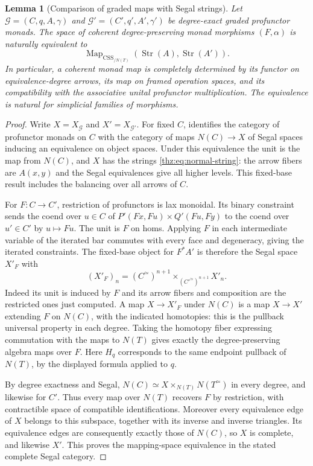 \documentclass[oneside]{article}
\theoremstyle{plain}
\newtheorem{lemma}[theorem]{Lemma}
\theoremstyle{definition}
\theoremstyle{remark}
\newcommand{\Map}{\operatorname{Map}}
\newcommand{\core}{\simeq}
\begin{document}
\begin{lemma}[Comparison of graded maps with Segal strings]
\label{lem:graded-map-comparison}
Let $\mathcal G=(C,q,A,\gamma)$ and
$\mathcal G'=(C',q',A',\gamma')$ be degree-exact graded
profunctor monads. The space of coherent degree-preserving monad
morphisms $(F,\alpha)$ is naturally equivalent to
\[
 \Map_{\operatorname{CSS}_{/N(T)}}
       (\operatorname{Str}(A),\operatorname{Str}(A')).
\]
In particular, a coherent monad map is completely determined by its
functor on equivalence-degree arrows, its map on framed operation
spaces, and its compatibility with the associative unital profunctor
multiplication. The equivalence is natural for simplicial families of
morphisms.
\end{lemma}
\begin{proof}
Write $X=X_{\mathcal G}$ and $X'=X_{\mathcal G'}$. For fixed $C$,
\cite[Cor.~5.19]{Kositsyn2021} identifies the category of profunctor
monads on $C$ with the category of maps $N(C)\to X$ of Segal spaces
inducing an equivalence on object spaces. Under this equivalence the
unit is the map from $N(C)$, and $X$ has the strings
\eqref{thz:eq:normal-string}: the arrow fibers are $A(x,y)$ and the
Segal equivalences give all higher levels. This fixed-base result
includes the balancing over all arrows of $C$.

For $F:C\to C'$, restriction of profunctors is lax monoidal. Its
binary constraint sends the coend over $u\in C$ of
$P'(Fx,Fu)\times Q'(Fu,Fy)$ to the coend over $u'\in C'$ by $u\mapsto Fu$.
The unit is $F$ on homs. Applying $F$ in each intermediate variable
of the iterated bar commutes with every face and degeneracy, giving
the iterated constraints. The fixed-base object for $F^*A'$ is therefore
the Segal space $X'_F$ with
\[
 (X'_F)_n=(C^\core)^{n+1}
        \times_{(C'^\core)^{n+1}}X'_n .
\]
Indeed its unit is induced by $F$ and its arrow fibers and composition
are the restricted ones just computed. A map $X\to X'_F$ under $N(C)$
is a map $X\to X'$ extending $F$ on $N(C)$, with the indicated
homotopies: this is the pullback universal property in each degree.
Taking the homotopy fiber expressing commutation with the maps to
$N(T)$ gives exactly the degree-preserving algebra maps over $F$.
Here $H_q$ corresponds to the same endpoint pullback of $N(T)$, by
the displayed formula applied to $q$.

By degree exactness and Segal, $N(C)\simeq X\times_{N(T)}N(T^\core)$
in every degree, and likewise for $C'$. Thus every map over $N(T)$
recovers $F$ by restriction, with contractible space of compatible
identifications. Moreover every equivalence edge of $X$ belongs to
this subspace, together with its inverse and inverse triangles.
Its equivalence edges are consequently exactly those of $N(C)$,
so $X$ is complete, and likewise $X'$. This proves the mapping-space
equivalence in the stated complete Segal category.


\end{proof}
\end{document}
